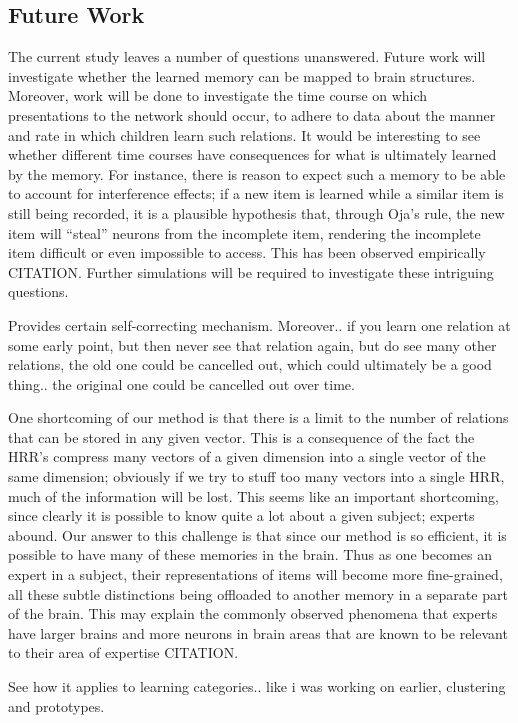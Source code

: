 \documentclass[10pt,letterpaper]{article}
\begin{document}
\subsection{Future Work}
The current study leaves a number of questions unanswered. Future work will investigate whether the learned memory can be mapped to brain structures. Moreover, work will be done to investigate the time course on which presentations to the network should occur, to adhere to data about the manner and rate in which children learn such relations. It would be interesting to see whether different time courses have consequences for what is ultimately learned by the memory. For instance, there is reason to expect such a memory to be able to account for interference effects; if a new item is learned while a similar item is still being recorded, it is a plausible hypothesis that, through Oja's rule, the new item will ``steal'' neurons from the incomplete item, rendering the incomplete item difficult or even impossible to access. This has been observed empirically CITATION. Further simulations will be required to investigate these intriguing questions.

Provides certain self-correcting mechanism.
Moreover.. if you learn one relation at some early point, but then never see that relation again, but do see many other relations, the old one could be cancelled out, which could ultimately be a good thing.. the original one could be cancelled out over time.

One shortcoming of our method is that there is a limit to the number of relations that can be stored in any given vector. This is a consequence of the fact the HRR's compress many vectors of a given dimension into a single vector of the same dimension; obviously if we try to stuff too many vectors into a single HRR, much of the information will be lost. This seems like an important shortcoming, since clearly it is possible to know quite a lot about a given subject; experts abound. Our answer to this challenge is that since our method is so efficient, it is possible to have many of these memories in the brain. Thus as one becomes an expert in a subject, their representations of items will become more fine-grained, all these subtle distinctions being offloaded to another memory in a separate part of the brain. This may explain the commonly observed phenomena that experts have larger brains and more neurons in brain areas that are known to be relevant to their area of expertise CITATION.

See how it applies to learning categories.. like i was working on earlier, clustering and prototypes.
\end{document}
